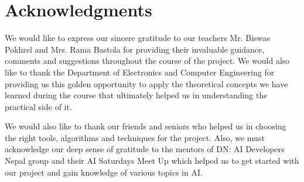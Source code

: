 \cleardoublepage
{}
\chapter*{Acknowledgments}
We would like to express our sincere gratitude to our teachers Mr. Biswas Pokhrel and Mrs. Rama Bastola for providing their invaluable guidance, comments and suggestions throughout the course of the project. We would also like to thank the Department of Electronics and Computer Engineering for providing us this golden opportunity to apply the theoretical concepts we have learned during the course that ultimately helped us in understanding the practical side of it.

We would also like to thank our friends and seniors who helped us in choosing the right tools, algorithms and techniques for the project. Also, we must acknowledge our deep sense of gratitude to the mentors of DN: AI Developers Nepal group and their AI Saturdays Meet Up which helped us to get started with our project and gain knowledge of various topics in AI. 
\newpage
